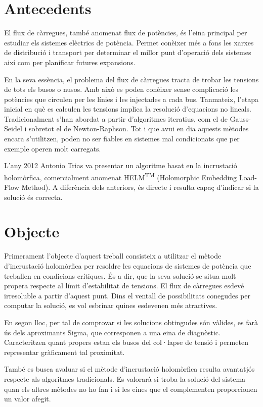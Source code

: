 \section{Antecedents}
El flux de càrregues, també anomenat flux de potències, és l'eina principal per estudiar els sistemes elèctrics de potència. Permet conèixer més a fons les xarxes de distribució i transport per determinar el millor punt d'operació dels sistemes així com per planificar futures expansions.

En la seva essència, el problema del flux de càrregues tracta de trobar les tensions de tots els busos o nusos. Amb això es poden conèixer sense complicació les potències que circulen per les línies i les injectades a cada bus. Tanmateix, l'etapa inicial en què es calculen les tensions implica la resolució d'equacions no lineals. Tradicionalment s'han abordat a partir d'algoritmes iteratius, com el de Gauss-Seidel i sobretot el de Newton-Raphson. Tot i que avui en dia aquests mètodes encara s'utilitzen, poden no ser fiables en sistemes mal condicionats que per exemple operen molt carregats.

L'any 2012 Antonio Trias va presentar un algoritme basat en la incrustació holomòrfica, comercialment anomenat HELM\textsuperscript{\scriptsize{TM}} (Holomorphic Embedding Load-Flow Method). A diferència dels anteriors, és directe i resulta capaç d'indicar si la solució és correcta. 


\section{Objecte}
Primerament l'objecte d'aquest treball consisteix a utilitzar el mètode d'incrustació holomòrfica per resoldre les equacions de sistemes de potència que treballen en condicions crítiques. És a dir, que la seva solució se situa molt propera respecte al límit d'estabilitat de tensions. El flux de càrregues esdevé irresoluble a partir d'aquest punt. Dins el ventall de possibilitats conegudes per computar la solució, es vol esbrinar quines esdevenen més atractives. 

En segon lloc, per tal de comprovar si les solucions obtingudes són vàlides, es farà ús dels aproximants Sigma, que corresponen a una eina de diagnòstic. Caracteritzen quant propers estan els busos del col·lapse de tensió i permeten representar gràficament tal proximitat.

També es busca avaluar si el mètode d'incrustació holomòrfica resulta avantatjós respecte als algoritmes tradicionals. Es valorarà si troba la solució del sistema quan els altres mètodes no ho fan i si les eines que el complementen proporcionen un valor afegit. 


